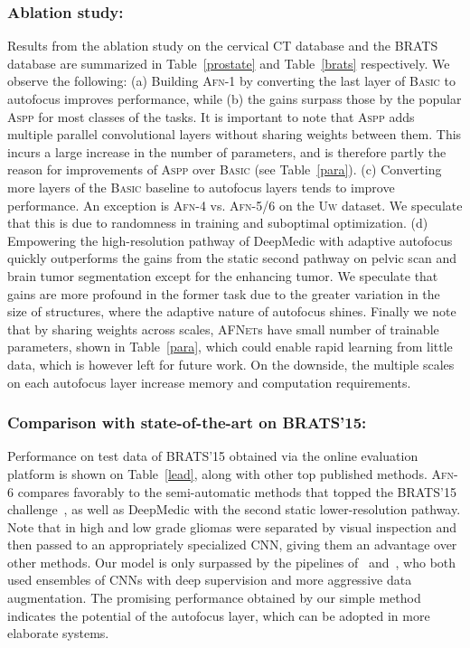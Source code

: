 \documentclass{llncs}
\newcommand{\afn}{\textsc{AFNet}}
\begin{document}
\subsubsection{Ablation study:}
Results from the ablation study on the cervical CT database and the BRATS database are summarized in Table~\ref{prostate} and Table~\ref{brats} respectively. We observe the following: (a) Building \textsc{Afn}-1 by converting the last layer of \textsc{Basic} to autofocus improves performance, while (b) the gains surpass those by the popular \textsc{Aspp} for most classes of the tasks. It is important to note that \textsc{Aspp} adds multiple parallel convolutional layers without sharing weights between them. This incurs a large increase in the number of  parameters,
and is therefore partly the reason for improvements of \textsc{Aspp} over \textsc{Basic} (see Table~\ref{para}). (c) Converting more layers of the \textsc{Basic} baseline to autofocus layers tends to improve performance. An exception is \textsc{Afn}-4 vs. \textsc{Afn}-5/6 on the \textsc{Uw} dataset. We speculate that this is due to randomness in training and suboptimal optimization. (d) Empowering the high-resolution pathway of DeepMedic with adaptive autofocus quickly outperforms the gains from the static second pathway on pelvic scan and brain tumor segmentation except for the enhancing tumor. We speculate that gains are more profound in the former task due to the greater variation in the size of structures, where the adaptive nature of autofocus shines. Finally we note that by sharing weights across scales, \afn{}s have small number of trainable parameters, shown in Table~\ref{para}, which could enable rapid learning from little data, which is however left for future work. On the downside, the multiple scales on each autofocus layer increase memory and computation requirements.

\vspace{-4mm}
\subsubsection{Comparison with state-of-the-art on BRATS'15:}
Performance on test data of BRATS'15 obtained via the online evaluation platform is shown on Table~\ref{lead}, along with other top published methods. \textsc{Afn}-6 compares favorably to the semi-automatic methods that topped the BRATS'15 challenge~\cite{bakas2015glistrboost,pereira2016brain}, as well as DeepMedic with the second static lower-resolution pathway. Note that in \cite{pereira2016brain} high and low grade gliomas were separated by visual inspection and then passed to an appropriately specialized CNN, giving them an advantage over other methods. Our model is only surpassed by the pipelines of~\cite{kayalibay2017cnn} and~\cite{isensee2017brain}, who both used ensembles of CNNs with deep supervision and more aggressive data augmentation. The promising performance obtained by our simple method indicates the potential of the autofocus layer, which can be adopted in more elaborate systems.
\end{document}
